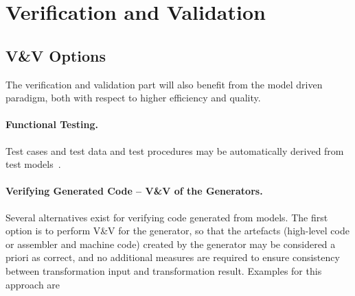 \documentclass[11pt, a4paper]{article}
\begin{document}
\section{Verification and Validation}



\subsection{V\&V Options}
The verification and validation part will also  benefit from the  model
driven paradigm, both with respect to higher efficiency and quality.

\paragraph{Functional Testing.}
Test cases and test data and test procedures may be automatically derived from test models~\cite{PeleskaVL11Nfm,pel2011a}.

\paragraph{Verifying Generated Code -- V\&V of the Generators.}
Several alternatives exist for verifying code generated from models. The first option is to perform V\&V for the
generator, so that the artefacts (high-level code or assembler and machine code) created by the generator may be considered a priori as correct, and no additional measures are required to ensure consistency between transformation input  and transformation result. 
Examples for this approach are
\end{document}
